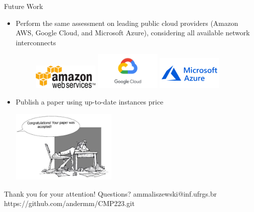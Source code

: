 \documentclass{beamer}
\begin{document}
\begin{frame}[t]{Future Work}
\begin{itemize}
    \item Perform the same assessment on leading public cloud providers (Amazon AWS, Google Cloud, and Microsoft Azure), considering all available network interconnects
   \begin{figure}
   \includegraphics[width=0.3\textwidth]{SLIDES/logo/amazon.png}
   \hfill
   \includegraphics[width=0.3\textwidth]{SLIDES/logo/Google_logo.png}
   \hfill
   \includegraphics[width=0.3\textwidth]{SLIDES/logo/Azure_logo.png}
\end{figure}
    \pause\item Publish a paper using up-to-date instances price
    \begin{center}
        \includegraphics[width=0.4\textwidth]{SLIDES/logo/Publishing.png}
    \end{center}
\end{itemize}
\end{frame}
\logo{}

\begin{frame}{}
\begin{center}
\Huge{Thank you for your attention! Questions?}
\vfill
\Large{ammaliszewski@inf.ufrgs.br}
\vfill
\small{https://github.com/andermm/CMP223.git}
\end{center}
\end{frame}
\end{document}
